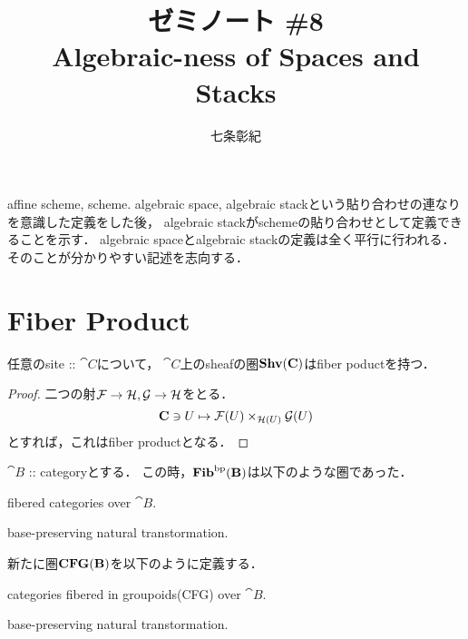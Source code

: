 \documentclass[a4paper, dvipdfmx]{jsarticle}
\begin{document}
\title{ゼミノート \#8 \\ Algebraic-ness of Spaces and Stacks}
\author{七条彰紀}
\maketitle
\tableofcontents

\vspace{10pt}

affine scheme, scheme. algebraic space, algebraic stackという貼り合わせの連なりを意識した定義をした後，
algebraic stackがschemeの貼り合わせとして定義できることを示す．
algebraic spaceとalgebraic stackの定義は全く平行に行われる．
そのことが分かりやすい記述を志向する．

\section{Fiber Product}
\begin{Prop}
    任意のsite :: $\cat{C}$について，
    $\cat{C}$上のsheafの圏$\mathbf{Shv}(\mathbf{C})$はfiber poductを持つ．
\end{Prop}
\begin{proof}
    二つの射$\mathcal{F} \to \mathcal{H}, \mathcal{G} \to \mathcal{H}$をとる．
    \[ \mathbf{C} \ni U \mapsto \mathcal{F}(U) \times_{\mathcal{H}(U)} \mathcal{G}(U) \]
    とすれば，これはfiber productとなる．
\end{proof}

$\cat{B}$ :: categoryとする．
この時，$\mathbf{Fib}^{\mathrm{bp}}(\mathbf{B})$は以下のような圏であった．
\begin{description}[labelindent=1cm]
    \item[Objects:] fibered categories over $\cat{B}$.
    \item[Arrows:]  base-preserving natural transtormation.
\end{description}
新たに圏$\mathbf{CFG}(\mathbf{B})$を以下のように定義する．
\begin{description}[labelindent=1cm]
    \item[Objects:] categories fibered in groupoids(CFG) over $\cat{B}$.
    \item[Arrows:] base-preserving natural transtormation.
\end{description}
\end{document}
